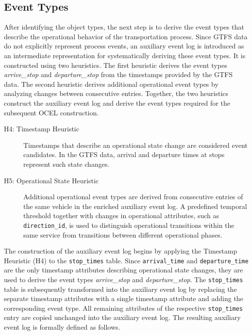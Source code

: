 \subsection{Event Types}

After identifying the object types, the next step is to derive the event types that describe the operational behavior of the transportation process. Since GTFS data do not explicitly represent process events, an auxiliary event log is introduced as an intermediate representation for systematically deriving these event types. It is constructed using two heuristics. The first heuristic derives the event types \textit{arrive\_stop} and \textit{departure\_stop} from the timestamps provided by the GTFS data. The second heuristic derives additional operational event types by analyzing changes between consecutive entries. Together, the two heuristics construct the auxiliary event log and derive the event types required for the subsequent OCEL construction.

\begin{description}
    \item[H4: Timestamp Heuristic]
    Timestamps that describe an operational state change are considered event candidates. In the GTFS data, arrival and departure times at stops represent such state changes.

\item[H5: Operational State Heuristic]
Additional operational event types are derived from consecutive entries of the same vehicle in the enriched auxiliary event log. A predefined temporal threshold together with changes in operational attributes, such as \texttt{direction\_id}, is used to distinguish operational transitions within the same service from transitions between different operational phases.
\end{description}

The construction of the auxiliary event log begins by applying the Timestamp Heuristic (H4) to the \texttt{stop\_times} table. Since \texttt{arrival\_time} and \texttt{departure\_time} are the only timestamp attributes describing operational state changes, they are used to derive the event types \textit{arrive\_stop} and \textit{departure\_stop}. The \texttt{stop\_times} table is subsequently transformed into the auxiliary event log by replacing the separate timestamp attributes with a single timestamp attribute and adding the corresponding event type. All remaining attributes of the respective \texttt{stop\_times} entry are copied unchanged into the auxiliary event log. The resulting auxiliary event log is formally defined as follows.


